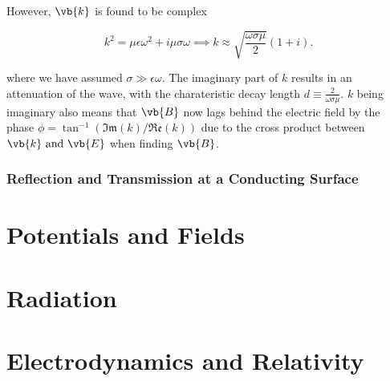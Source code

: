 \documentclass[english,a4paper,12pt]{report}
\begin{document}
However, \(\vb{k} \) is found to be complex

\begin{equation}
    k^2 = \mu \epsilon \omega ^2 + i\mu \sigma \omega \implies k \approx \sqrt{\frac{\omega \sigma \mu }{2} } (1+i). 
\end{equation}

where we have assumed \(\sigma \gg \epsilon \omega \). The imaginary part of \(k\) results in an attenuation of the wave, with the charateristic decay length \(d \equiv \frac{2}{\omega \sigma \mu } \). \(k\) being imaginary also means that \(\vb{B} \) now lags behind the electric field by the phase \(\phi = \tan ^{-1} (\mathfrak{Im} (k)/\mathfrak{Re} (k))\) due to the cross product between \(\vb{k} \text { and } \vb{E} \) when finding \(\vb{B} \). 

\subsection{Reflection and Transmission at a Conducting Surface}










\chapter{Potentials and Fields}


\chapter{Radiation}

\chapter{Electrodynamics and Relativity}
\end{document}
